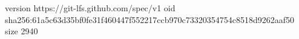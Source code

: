 version https://git-lfs.github.com/spec/v1
oid sha256:61a5c63d35bf0fe31f460447f552217ccb970c73320354754c8518d9262aaf50
size 2940
